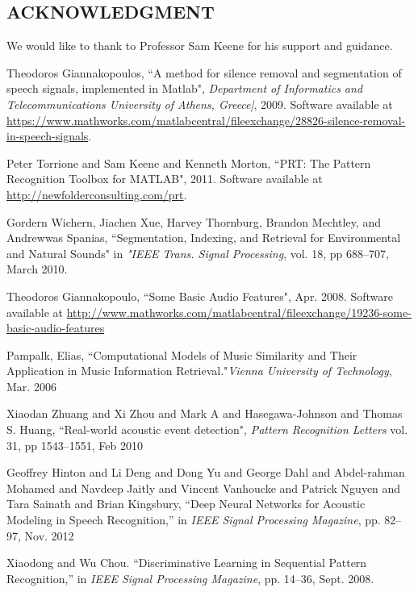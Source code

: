 \documentclass{article}
\begin{document}
\begin{sloppy}
\section{ACKNOWLEDGMENT}
\label{sec:ack}
We would like to thank to Professor Sam Keene for his support and guidance.


%
%

 \begin{thebibliography}{8}
	Theodoros Giannakopoulos, ``A method for silence removal and segmentation of speech signals, implemented in Matlab",\emph{ Department of Informatics and Telecommunications University of Athens, Greece|}, 2009. Software available at \url{https://www.mathworks.com/matlabcentral/fileexchange/28826-silence-removal-in-speech-signals}.

 Peter Torrione and Sam Keene and Kenneth Morton, ``{PRT}: The Pattern Recognition Toolbox for {MATLAB}", 2011. Software available at \url{http://newfolderconsulting.com/prt}.

 	Gordern Wichern, Jiachen Xue, Harvey Thornburg, Brandon Mechtley, and Andrewwas Spanias, ``Segmentation, Indexing, and Retrieval for Environmental and Natural Sounds" in \emph{"IEEE Trans. Signal Processing}, vol. 18, pp 688--707, March 2010.

 Theodoros Giannakopoulo, ``Some Basic Audio Features", Apr. 2008. Software available at \url{http://www.mathworks.com/matlabcentral/fileexchange/19236-some-basic-audio-features}

Pampalk, Elias, ``Computational Models of Music Similarity and Their Application in Music Information Retrieval."\emph{Vienna University of Technology}, Mar. 2006

Xiaodan Zhuang and Xi Zhou and Mark A and Hasegawa-Johnson and Thomas S. Huang, ``Real-world acoustic event detection", \emph{Pattern Recognition Letters} vol. 31, pp 1543--1551, Feb 2010

Geoffrey Hinton and Li Deng and Dong Yu and George Dahl and Abdel-rahman Mohamed and Navdeep Jaitly and Vincent Vanhoucke and Patrick Nguyen and Tara Sainath and Brian Kingsbury,  ``Deep Neural Networks for Acoustic Modeling in Speech Recognition,'' in \emph{IEEE Signal Processing Magazine}, pp. 82--97, Nov. 2012
 
Xiaodong and Wu Chou. ``Discriminative Learning in Sequential Pattern Recognition,''  in \emph{IEEE Signal Processing Magazine}, pp. 14--36, Sept. 2008.
 
 \end{thebibliography}


\end{sloppy}
\end{document}
